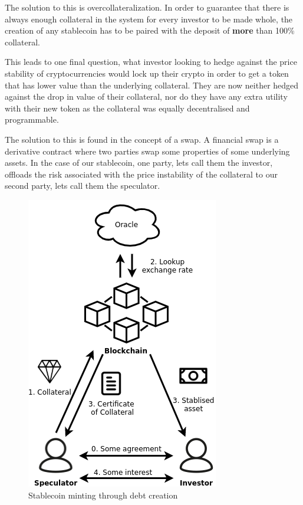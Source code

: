 \documentclass[english,]{IEEEtran}
\begin{document}
The solution to this is overcollateralization. In order to guarantee
that there is always enough collateral in the system for every investor
to be made whole, the creation of any stablecoin has to be paired with
the deposit of \textbf{more} than 100\% collateral.

This leads to one final question, what investor looking to hedge against
the price stability of cryptocurrencies would lock up their crypto in
order to get a token that has lower value than the underlying
collateral. They are now neither hedged against the drop in value of
their collateral, nor do they have any extra utility with their new
token as the collateral was equally decentralised and programmable.

The solution to this is found in the concept of a swap. A financial swap
is a derivative contract where two parties swap some properties of some
underlying assets. In the case of our stablecoin, one party, lets call
them the investor, offloads the risk associated with the price
instability of the collateral to our second party, lets call them the
speculator.

\begin{figure}[htbp]
\centering
\includegraphics{img/CDP_create.png}
\caption{Stablecoin minting through debt creation
\label{cdp_destroy_label}}
\end{figure}
\end{document}
